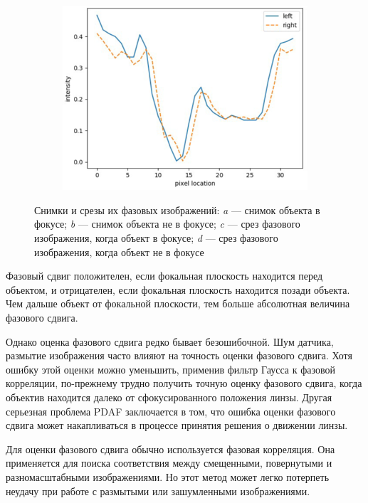 \begin{figure}[!htbp]
\begin{subfigure}[t]{0.45\linewidth}
		\caption{}
		\label{fig:phase_image-c}
	\end{subfigure}
	\hfill
	\begin{subfigure}[t]{0.45\linewidth}
		\centering
		\includegraphics[width=.85\linewidth]{my_folder/images/phase_image_4}
		\caption{}
		\label{fig:phase_image-d}
	\end{subfigure}
	\caption{Снимки и срезы их фазовых изображений: {\itshape a} --- снимок объекта в фокусе; {\itshape b} --- снимок объекта не в фокусе; {\itshape c} --- срез фазового изображения, когда объект в фокусе; {\itshape d} --- срез фазового изображения, когда объект не в фокусе}
	\label{fig:phase_images}  
\end{figure}

Фазовый сдвиг положителен, если фокальная плоскость находится перед объектом, и отрицателен, если фокальная плоскость находится позади объекта. Чем дальше объект от фокальной плоскости, тем больше абсолютная величина фазового сдвига.

Однако оценка фазового сдвига редко бывает безошибочной. Шум датчика, размытие изображения часто влияют на точность оценки фазового сдвига. Хотя ошибку этой оценки можно уменьшить, применив фильтр Гаусса к фазовой корреляции, по-прежнему трудно получить точную оценку фазового сдвига, когда объектив находится далеко от сфокусированного положения линзы. Другая серьезная проблема PDAF заключается в том, что ошибка оценки фазового сдвига может накапливаться в процессе принятия решения о движении линзы.

Для оценки фазового сдвига обычно используется фазовая корреляция. Она применяется для поиска соответствия между смещенными, повернутыми и разномасштабными изображениями. Но этот метод может легко потерпеть неудачу при работе с размытыми или зашумленными изображениями.

